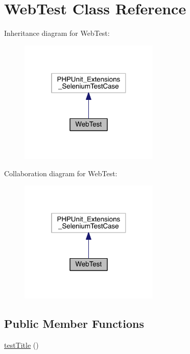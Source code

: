 \hypertarget{class_web_test}{\section{Web\-Test Class Reference}
\label{class_web_test}
}


Inheritance diagram for Web\-Test\-:
\nopagebreak
\begin{figure}[H]
\begin{center}
\leavevmode
\includegraphics[width=188pt]{class_web_test__inherit__graph}
\end{center}
\end{figure}


Collaboration diagram for Web\-Test\-:
\nopagebreak
\begin{figure}[H]
\begin{center}
\leavevmode
\includegraphics[width=188pt]{class_web_test__coll__graph}
\end{center}
\end{figure}
\subsection*{Public Member Functions}
\begin{DoxyCompactItemize}
\item 
\hyperlink{class_web_test_a0cb42f4056ad7981baaed0645bf468c7}{test\-Title} ()
\end{DoxyCompactItemize}
